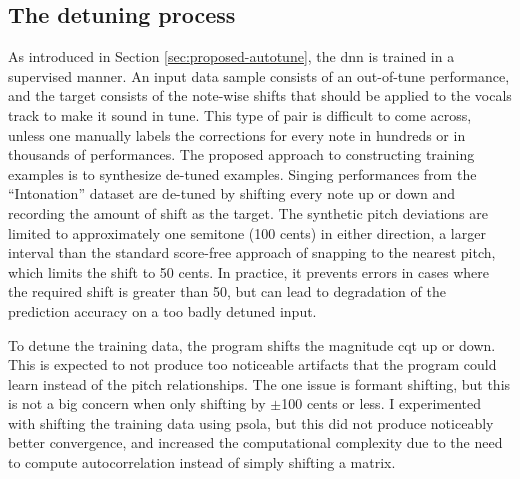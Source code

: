 
\subsection{The detuning process}
As introduced in Section \ref{sec:proposed-autotune}, the \gls{dnn} is trained in a supervised manner. An input data sample consists of an out-of-tune performance, and the target consists of the note-wise shifts that should be applied to the vocals track to make it sound in tune. This type of pair is difficult to come across, unless one manually labels the corrections for every note in hundreds or in thousands of performances. The proposed approach to constructing training examples is to synthesize de-tuned examples. Singing performances from the ``Intonation'' dataset are de-tuned by shifting every note up or down and recording the amount of shift as the target. The synthetic pitch deviations are limited to approximately one semitone (100 cents) in either direction, a larger interval than the standard score-free approach of snapping to the nearest pitch, which limits the shift to 50 cents. In practice, it prevents errors in cases where the required shift is greater than 50, but can lead to degradation of the prediction accuracy on a too badly detuned input. 

To detune the training data, the program shifts the magnitude \gls{cqt} up or down. This is expected to not produce too noticeable artifacts that the program could learn instead of the pitch relationships. The one issue is formant shifting, but this is not a big concern when only shifting by $\pm$100 cents or less. I experimented with shifting the training data using \gls{psola}, but this did not produce noticeably better convergence, and increased the computational complexity due to the need to compute autocorrelation instead of simply shifting a matrix. 

